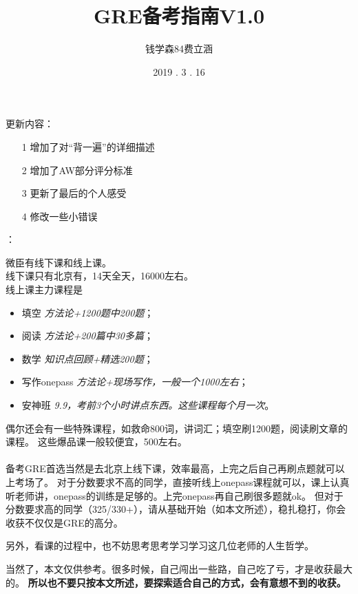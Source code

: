 \documentclass[blue, pc, cn]{elegantnote}
\title{GRE备考指南V1.0}
\author{钱学森84费立涵}
\institute{小破楼资料编写小组\LaTeX}
\date{2019 . 3 . 16}
\begin{document}
    \maketitle
    \newpage
    {\centering
    更新内容：
    \begin{enumerate}
        \item[1]增加了对“背一遍”的详细描述
        \item[2]增加了AW部分评分标准
        \item[3]更新了最后的个人感受
        \item[4]修改一些小错误
    \end{enumerate}
    }
    \newpage
    \begin{flushleft}
        {：} \\
        {\small
        微臣有线下课和线上课。 \\
        线下课只有北京有，14天全天，16000左右。 \\
        线上课主力课程是
        \begin{itemize}
            \item 填空  \textit{方法论+1200题中200题}；
            \item 阅读  \textit{方法论+200篇中30多篇}；
            \item 数学  \textit{知识点回顾+精选200题}；
            \item 写作onepass   \textit{方法论+现场写作，一般一个1000左右}；
            \item 安神班    \textit{9.9，考前3个小时讲点东西。这些课程每个月一次}。
        \end{itemize}
      
        偶尔还会有一些特殊课程，如救命800词，讲词汇；填空刷1200题，阅读刷文章的课程。
        这些爆品课一般较便宜，500左右。
    
    
        \paragraph{}备考GRE首选当然是去北京上线下课，效率最高，上完之后自己再刷点题就可以上考场了。
        对于分数要求不高的同学，直接听线上onepass课程就可以，课上认真听老师讲，onepass的训练是足够的。上完onepass再自己刷很多题就ok。
        但对于分数要求高的同学（325/330+），请从基础开始（如本文所述），稳扎稳打，你会收获不仅仅是GRE的高分。
    
        另外，看课的过程中，也不妨思考思考学习学习这几位老师的人生哲学。
        
        当然了，本文仅供参考。很多时候，自己闯出一些路，自己吃了亏，才是收获最大的。
        \textbf{所以也不要只按本文所述，要探索适合自己的方式，会有意想不到的收获。}
        }
    \end{flushleft} 
   
\end{document}
